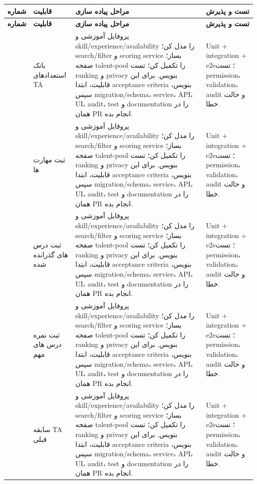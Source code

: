 \documentclass[11pt,a4paper]{article}
\begin{document}
\begin{longtable}{|>{\raggedleft\arraybackslash}p{}|>{\raggedleft\arraybackslash}p{}|>{\raggedleft\arraybackslash}p{}|>{\raggedleft\arraybackslash}p{}|}
\hline
\textbf{شماره} & \textbf{قابلیت} & \textbf{مراحل پیاده سازی} & \textbf{تست و پذیرش} \\\hline
\endfirsthead
\hline
\textbf{شماره} & \textbf{قابلیت} & \textbf{مراحل پیاده سازی} & \textbf{تست و پذیرش} \\\hline
\endhead
76 & بانک استعدادهای TA & پروفایل آموزشی و skill/experience/availability را مدل کن؛ search/filter و scoring service بساز؛ صفحه talent-pool را تکمیل کن؛ تست ranking و privacy بنویس. برای این قابلیت، ابتدا acceptance criteria بنویس، سپس migration/schema، service، API، UI، audit، test و documentation را در همان PR انجام بده. & Unit + integration + e2e؛ تست permission، validation، audit و حالت خطا. \\ \hline
77 & ثبت مهارت ها & پروفایل آموزشی و skill/experience/availability را مدل کن؛ search/filter و scoring service بساز؛ صفحه talent-pool را تکمیل کن؛ تست ranking و privacy بنویس. برای این قابلیت، ابتدا acceptance criteria بنویس، سپس migration/schema، service، API، UI، audit، test و documentation را در همان PR انجام بده. & Unit + integration + e2e؛ تست permission، validation، audit و حالت خطا. \\ \hline
78 & ثبت درس های گذرانده شده & پروفایل آموزشی و skill/experience/availability را مدل کن؛ search/filter و scoring service بساز؛ صفحه talent-pool را تکمیل کن؛ تست ranking و privacy بنویس. برای این قابلیت، ابتدا acceptance criteria بنویس، سپس migration/schema، service، API، UI، audit، test و documentation را در همان PR انجام بده. & Unit + integration + e2e؛ تست permission، validation، audit و حالت خطا. \\ \hline
79 & ثبت نمره درس های مهم & پروفایل آموزشی و skill/experience/availability را مدل کن؛ search/filter و scoring service بساز؛ صفحه talent-pool را تکمیل کن؛ تست ranking و privacy بنویس. برای این قابلیت، ابتدا acceptance criteria بنویس، سپس migration/schema، service، API، UI، audit، test و documentation را در همان PR انجام بده. & Unit + integration + e2e؛ تست permission، validation، audit و حالت خطا. \\ \hline
80 & سابقه TA قبلی & پروفایل آموزشی و skill/experience/availability را مدل کن؛ search/filter و scoring service بساز؛ صفحه talent-pool را تکمیل کن؛ تست ranking و privacy بنویس. برای این قابلیت، ابتدا acceptance criteria بنویس، سپس migration/schema، service، API، UI، audit، test و documentation را در همان PR انجام بده. & Unit + integration + e2e؛ تست permission، validation، audit و حالت خطا. \\ \hline

\end{longtable}
\end{document}
